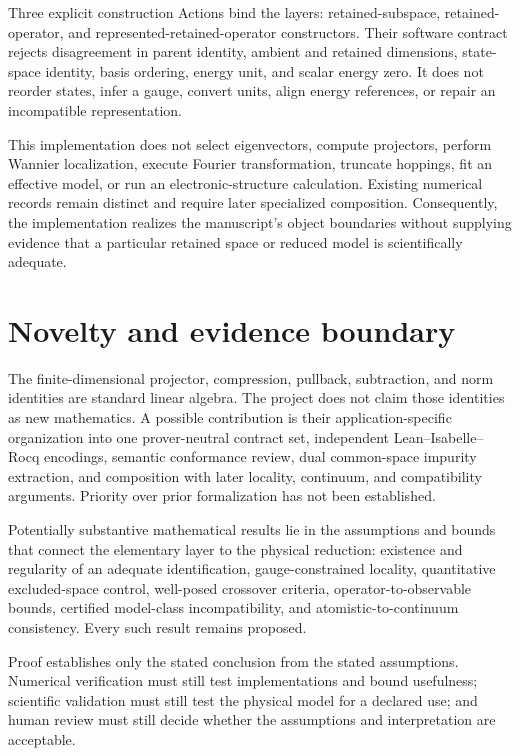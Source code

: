 Three explicit construction Actions bind the layers: retained-subspace,
retained-operator, and represented-retained-operator constructors. Their
software contract rejects disagreement in parent identity, ambient and retained
dimensions, state-space identity, basis ordering, energy unit, and scalar energy
zero. It does not reorder states, infer a gauge, convert units, align energy
references, or repair an incompatible representation.

This implementation does not select eigenvectors, compute projectors, perform
Wannier localization, execute Fourier transformation, truncate hoppings, fit an
effective model, or run an electronic-structure calculation. Existing
numerical records remain distinct and require later specialized composition.
Consequently, the implementation realizes the manuscript's object boundaries
without supplying evidence that a particular retained space or reduced model is
scientifically adequate.

\section{Novelty and evidence boundary}


The finite-dimensional projector, compression, pullback, subtraction, and norm
identities are standard linear algebra. The project does not claim those
identities as new mathematics. A possible contribution is their
application-specific organization into one prover-neutral contract set,
independent Lean--Isabelle--Rocq encodings, semantic conformance review, dual
common-space impurity extraction, and composition with later locality,
continuum, and compatibility arguments. Priority over prior formalization has
not been established.

Potentially substantive mathematical results lie in the assumptions and bounds
that connect the elementary layer to the physical reduction: existence and
regularity of an adequate identification, gauge-constrained locality,
quantitative excluded-space control, well-posed crossover criteria,
operator-to-observable bounds, certified model-class incompatibility, and
atomistic-to-continuum consistency. Every such result remains proposed.

Proof establishes only the stated conclusion from the stated assumptions.
Numerical verification must still test implementations and bound usefulness;
scientific validation must still test the physical model for a declared use;
and human review must still decide whether the assumptions and interpretation
are acceptable.
